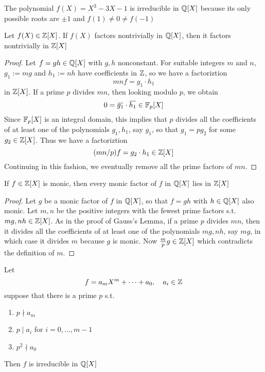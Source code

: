 \documentclass[11pt]{article}
\begin{document}
\begin{examplle}[]
The polynomial \(f(X)=X^3-3X-1\) is irreducible in \(\mathbb{Q}[X]\) because its only possible roots
are \(\pm 1\) and \(f(1)\neq 0\neq f(-1)\)
\end{examplle}

\begin{proposition}
Let \(f(X)\in\mathbb{Z}[X]\). If \(f(X)\) factors nontrivially in \(\mathbb{Q}[X]\), then it factors nontrivially in \(\mathbb{Z}[X]\)
\end{proposition}

\begin{proof}
Let \(f=gh\in\mathbb{Q}[X]\) with \(g,h\) nonconstant. For suitable integers \(m\) and \(n\), \(g_1:=mg\)
and \(h_1:=nh\) have coefficients in \(\mathbb{Z}\), so we have a factoriztion
\begin{equation*}
mnf=g_1\cdot h_1
\end{equation*}
in \(\mathbb{Z}[X]\). If a prime \(p\) divides \(mn\), then looking modulo \(p\), we obtain
\begin{equation*}
0=\bbar{g_1}\cdot\bbar{h_1}\in\F_p[X]
\end{equation*}
Since \(\mathbb{F}_p[X]\) is an integral domain, this implies that \(p\) divides all the coefficients of
at least one of the polynomials \(g_1,h_1\), say \(g_1\), so that \(g_1=pg_2\) for some \(g_2\in\mathbb{Z}[X]\).
Thus we have a factoriztion
\begin{equation*}
(mn/p)f=g_2\cdot h_1\in\mathbb{Z}[X]
\end{equation*}
Continuing in this fashion, we eventually remove all the prime factors of \(mn\).
\end{proof}

\begin{proposition}[]
If \(f\in\mathbb{Z}[X]\) is monic, then every monic factor of \(f\) in \(\mathbb{Q}[X]\) lies in \(\mathbb{Z}[X]\)
\end{proposition}

\begin{proof}
Let \(g\) be a monic factor of \(f\) in \(\mathbb{Q}[X]\), so that \(f=gh\) with \(h\in\mathbb{Q}[X]\) also monic.
Let \(m,n\) be the positive integers with the fewest prime factors s.t. \(mg,nh\in\mathbb{Z}[X]\). As in
the proof of Gauss's Lemma, if a prime \(p\) divides \(mn\), then it divides all the
coefficients of at least one of the polynomials \(mg,nh\), say \(mg\), in which case it
divides \(m\) because \(g\) is monic. Now \(\frac{m}{p}g\in\mathbb{Z}[X]\) which contradicts the definition
of \(m\).
\end{proof}

\begin{proposition}
\label{1.16}
Let
\begin{equation*}
f=a_mX^m+\dots+a_0,\quad a_i\in\mathbb{Z}
\end{equation*}
suppose that there is a prime \(p\) s.t.
\begin{enumerate}
\item \(p\nmid a_m\)
\item \(p\mid a_i\)  for \(i=0,\dots,m-1\)
\item \(p^2\nmid a_0\)
\end{enumerate}


Then \(f\) is irreducible in \(\mathbb{Q}[X]\)
\end{proposition}
\end{document}
